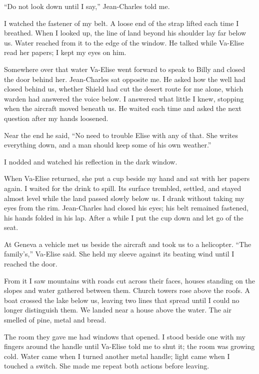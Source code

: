 ``Do not look down until I say,'' Jean-Charles told me.\par

I watched the fastener of my belt. A loose end of the strap lifted each time I breathed. When I looked up, the line of land beyond his shoulder lay far below us. Water reached from it to the edge of the window. He talked while Va-Elise read her papers; I kept my eyes on him.\par

Somewhere over that water Va-Elise went forward to speak to Billy and closed the door behind her. Jean-Charles sat opposite me. He asked how the well had closed behind us, whether Shield had cut the desert route for me alone, which warden had answered the voice below. I answered what little I knew, stopping when the aircraft moved beneath us. He waited each time and asked the next question after my hands loosened.\par

Near the end he said, ``No need to trouble Elise with any of that. She writes everything down, and a man should keep some of his own weather.''\par

I nodded and watched his reflection in the dark window.\par

When Va-Elise returned, she put a cup beside my hand and sat with her papers again. I waited for the drink to spill. Its surface trembled, settled, and stayed almost level while the land passed slowly below us. I drank without taking my eyes from the rim. Jean-Charles had closed his eyes; his belt remained fastened, his hands folded in his lap. After a while I put the cup down and let go of the seat.\par

At Geneva a vehicle met us beside the aircraft and took us to a helicopter. ``The family's,'' Va-Elise said. She held my sleeve against its beating wind until I reached the door.\par

From it I saw mountains with roads cut across their faces, houses standing on the slopes and water gathered between them. Church towers rose above the roofs. A boat crossed the lake below us, leaving two lines that spread until I could no longer distinguish them. We landed near a house above the water. The air smelled of pine, metal and bread.\par

The room they gave me had windows that opened. I stood beside one with my fingers around the handle until Va-Elise told me to shut it; the room was growing cold. Water came when I turned another metal handle; light came when I touched a switch. She made me repeat both actions before leaving.\par

